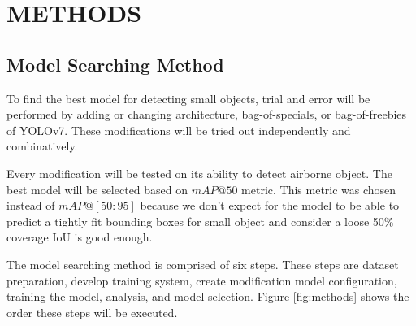 \chapter{METHODS}
\section{Model Searching Method}


To find the best model for detecting small objects, trial and error will be performed by
adding or changing architecture, bag-of-specials, or bag-of-freebies of YOLOv7.
These modifications will be tried out independently and combinatively.

Every modification will be tested on its ability to detect airborne object.
The best model will be selected based on $mAP@50$ metric.
This metric was chosen instead of $mAP@[50:95]$ because we don't expect for the model to be able to predict a tightly fit
bounding boxes for small object and consider a loose 50\% coverage IoU is good enough.

The model searching method is comprised of six steps.
These steps are dataset preparation, develop training system, create modification model configuration,
training the model, analysis, and model selection. 
Figure \ref{fig:methods} shows the order these steps will be executed.

